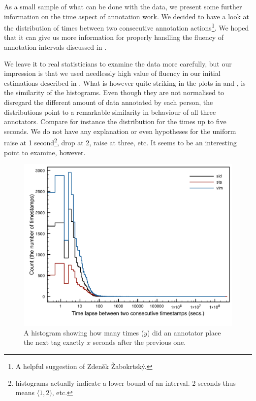 As a small sample of what can be done with the data, we present some further information on the time aspect of annotation work. We decided to have a look at the distribution of times between two consecutive annotation actions\footnote{A helpful suggestion of Zdeněk Žabokrtský.}. We hoped that it can give us more information for properly handling the fluency of annotation intervals discussed in . 

We leave it to real statisticians to examine the data more carefully, but our impression is that we used needlessly high value of fluency in our initial estimations described in . What is however quite striking in the plots in  and , is the similarity of the histograms. Even though they are not normalised to disregard the different amount of data annotated by each person, the distributions point to a remarkable similarity in behaviour of all three annotators. Compare for instance the distribution for the times up to five seconds. We do not have any explanation or even hypotheses for the uniform raise at 1 second\footnote{histograms actually indicate a lower bound of an interval. 2 seconds thus means $\langle1, 2)$, etc.}, drop at 2, raise at three, etc. It seems to be an interesting point to examine, however.

\begin{figure}[htbp]
   \centering
   \includegraphics[width=.8\textwidth]{images/speed/histograms} 
   \caption{A histogram showing how many times ($y$) did an annotator place the next tag exactly $x$ seconds after the previous one.} 
   \label{fig:hist}
\end{figure}

